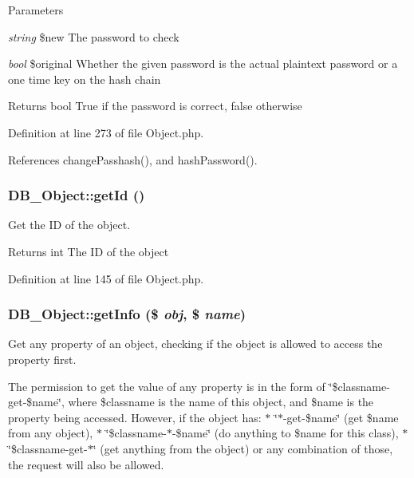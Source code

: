 \begin{DoxyParams}{Parameters}
\item[{\em string}]\$new The password to check \item[{\em bool}]\$original Whether the given password is the actual plaintext password or a one time key on the hash chain\end{DoxyParams}
\begin{DoxyReturn}{Returns}
bool True if the password is correct, false otherwise 
\end{DoxyReturn}


Definition at line 273 of file Object.php.

References changePasshash(), and hashPassword().\hypertarget{classDB__Object_ae09675ff1d492c3571766142196556df}{
\subsubsection[{getId}]{\setlength{\rightskip}{0pt plus 5cm}DB\_\-Object::getId ()}}
\label{dc/d6d/classDB__Object_ae09675ff1d492c3571766142196556df}
Get the ID of the object.

\begin{DoxyReturn}{Returns}
int The ID of the object 
\end{DoxyReturn}


Definition at line 145 of file Object.php.\hypertarget{classDB__Object_a45d1bd94aa7a815efa455c79742a3aff}{
\subsubsection[{getInfo}]{\setlength{\rightskip}{0pt plus 5cm}DB\_\-Object::getInfo (\$ {\em obj}, \/  \$ {\em name})}}
\label{dc/d6d/classDB__Object_a45d1bd94aa7a815efa455c79742a3aff}
Get any property of an object, checking if the object is allowed to access the property first.

The permission to get the value of any property is in the form of \char`\"{}\$classname-\/get-\/\$name\char`\"{}, where \$classname is the name of this object, and \$name is the property being accessed. However, if the object has: $\ast$ \char`\"{}$\ast$-\/get-\/\$name\char`\"{} (get \$name from any object), $\ast$ \char`\"{}\$classname-\/$\ast$-\/\$name\char`\"{} (do anything to \$name for this class), $\ast$ \char`\"{}\$classname-\/get-\/$\ast$\char`\"{} (get anything from the object) or any combination of those, the request will also be allowed.


